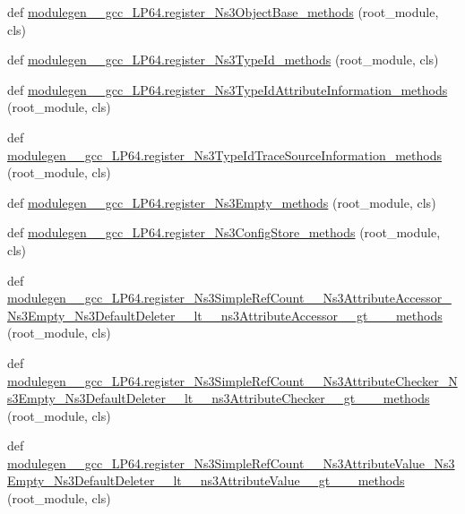 \begin{DoxyCompactItemize}
\item 
def \hyperlink{namespacemodulegen____gcc__LP64_a811b76d9911bfa2ed025b14b9a8aeb50}{modulegen\+\_\+\+\_\+gcc\+\_\+\+L\+P64.\+register\+\_\+\+Ns3\+Object\+Base\+\_\+methods} (root\+\_\+module, cls)
\item 
def \hyperlink{namespacemodulegen____gcc__LP64_adea84ddbc489895d2347d15ea1328bc0}{modulegen\+\_\+\+\_\+gcc\+\_\+\+L\+P64.\+register\+\_\+\+Ns3\+Type\+Id\+\_\+methods} (root\+\_\+module, cls)
\item 
def \hyperlink{namespacemodulegen____gcc__LP64_aae2764584a69687644f37b42586364df}{modulegen\+\_\+\+\_\+gcc\+\_\+\+L\+P64.\+register\+\_\+\+Ns3\+Type\+Id\+Attribute\+Information\+\_\+methods} (root\+\_\+module, cls)
\item 
def \hyperlink{namespacemodulegen____gcc__LP64_af7ee3e03193815233627c2c4b4b2ebf6}{modulegen\+\_\+\+\_\+gcc\+\_\+\+L\+P64.\+register\+\_\+\+Ns3\+Type\+Id\+Trace\+Source\+Information\+\_\+methods} (root\+\_\+module, cls)
\item 
def \hyperlink{namespacemodulegen____gcc__LP64_af245edb84966d4b4c48221a31647be89}{modulegen\+\_\+\+\_\+gcc\+\_\+\+L\+P64.\+register\+\_\+\+Ns3\+Empty\+\_\+methods} (root\+\_\+module, cls)
\item 
def \hyperlink{namespacemodulegen____gcc__LP64_a14f76af4c864bdc2c7776a6409dbcca1}{modulegen\+\_\+\+\_\+gcc\+\_\+\+L\+P64.\+register\+\_\+\+Ns3\+Config\+Store\+\_\+methods} (root\+\_\+module, cls)
\item 
def \hyperlink{namespacemodulegen____gcc__LP64_a9b358364d845a1ffcabb6be20a325b9d}{modulegen\+\_\+\+\_\+gcc\+\_\+\+L\+P64.\+register\+\_\+\+Ns3\+Simple\+Ref\+Count\+\_\+\+\_\+\+Ns3\+Attribute\+Accessor\+\_\+\+Ns3\+Empty\+\_\+\+Ns3\+Default\+Deleter\+\_\+\+\_\+lt\+\_\+\+\_\+ns3\+Attribute\+Accessor\+\_\+\+\_\+gt\+\_\+\+\_\+\+\_\+methods} (root\+\_\+module, cls)
\item 
def \hyperlink{namespacemodulegen____gcc__LP64_acc11c420e32471422fd00230d89398af}{modulegen\+\_\+\+\_\+gcc\+\_\+\+L\+P64.\+register\+\_\+\+Ns3\+Simple\+Ref\+Count\+\_\+\+\_\+\+Ns3\+Attribute\+Checker\+\_\+\+Ns3\+Empty\+\_\+\+Ns3\+Default\+Deleter\+\_\+\+\_\+lt\+\_\+\+\_\+ns3\+Attribute\+Checker\+\_\+\+\_\+gt\+\_\+\+\_\+\+\_\+methods} (root\+\_\+module, cls)
\item 
def \hyperlink{namespacemodulegen____gcc__LP64_abcd5829b1993ba7d28274b9959f71417}{modulegen\+\_\+\+\_\+gcc\+\_\+\+L\+P64.\+register\+\_\+\+Ns3\+Simple\+Ref\+Count\+\_\+\+\_\+\+Ns3\+Attribute\+Value\+\_\+\+Ns3\+Empty\+\_\+\+Ns3\+Default\+Deleter\+\_\+\+\_\+lt\+\_\+\+\_\+ns3\+Attribute\+Value\+\_\+\+\_\+gt\+\_\+\+\_\+\+\_\+methods} (root\+\_\+module, cls)

\end{DoxyCompactItemize}
